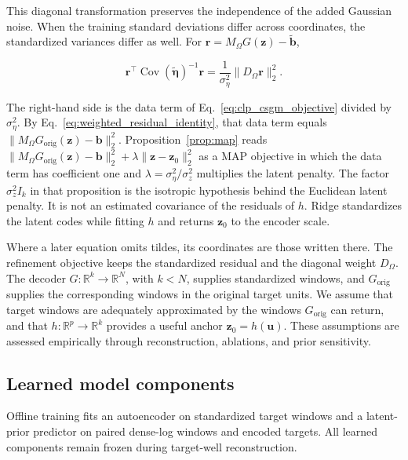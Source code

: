 This diagonal transformation preserves the independence of the added
Gaussian noise. When the training standard deviations differ across
coordinates, the standardized variances differ as well. For
$\boldsymbol{r}=M_{\Omega}G(\boldsymbol{z})-\widetilde{\boldsymbol{b}}$,

\begin{equation}
\boldsymbol{r}^{\top}
\operatorname{Cov}(\widetilde{\boldsymbol{\eta}})^{-1}
\boldsymbol{r}
=
\frac{1}{\sigma_{\eta}^{2}}
\|D_{\Omega}\boldsymbol{r}\|_2^2.
\label{eq:standardized_noise_likelihood}
\end{equation}

The right-hand side is the data term of
Eq.~\eqref{eq:clp_csgm_objective} divided by $\sigma_{\eta}^{2}$.
By Eq.~\eqref{eq:weighted_residual_identity}, that data term equals
$\|M_{\Omega}G_{\mathrm{orig}}(\boldsymbol{z})-\boldsymbol{b}\|_2^2$.
Proposition~\ref{prop:map} reads
$\|M_{\Omega}G_{\mathrm{orig}}(\boldsymbol{z})-\boldsymbol{b}\|_2^2
+\lambda\|\boldsymbol{z}-\boldsymbol{z}_0\|_2^2$
as a MAP objective in which the data term has coefficient one and
$\lambda=\sigma_{\eta}^{2}/\sigma_{z}^{2}$ multiplies the latent penalty.
The factor
$\sigma_z^{2}I_k$ in that proposition is the isotropic hypothesis behind
the Euclidean latent penalty. It is not an estimated covariance of the
residuals of $h$. Ridge standardizes the latent codes while fitting $h$
and returns $\boldsymbol{z}_0$ to the encoder scale.

Where a later equation omits tildes, its coordinates are those written there.
The refinement objective keeps the standardized residual and the diagonal
weight $D_{\Omega}$. The decoder
$G:\mathbb{R}^{k}\rightarrow\mathbb{R}^{N}$, with $k<N$, supplies
standardized windows, and $G_{\mathrm{orig}}$ supplies the corresponding
windows in the original target units. We assume that target windows are
adequately approximated by the windows $G_{\mathrm{orig}}$ can return, and that
$h:\mathbb{R}^{p}\rightarrow\mathbb{R}^{k}$ provides a useful anchor
$\boldsymbol{z}_0=h(\boldsymbol{u})$. These assumptions are assessed empirically
through reconstruction, ablations, and prior sensitivity.



\subsection{Learned model components}
\label{subsec:learned_priors}

Offline training fits an autoencoder on standardized target windows and a
latent-prior predictor on paired dense-log windows and encoded targets. All
learned components remain frozen during target-well reconstruction.

